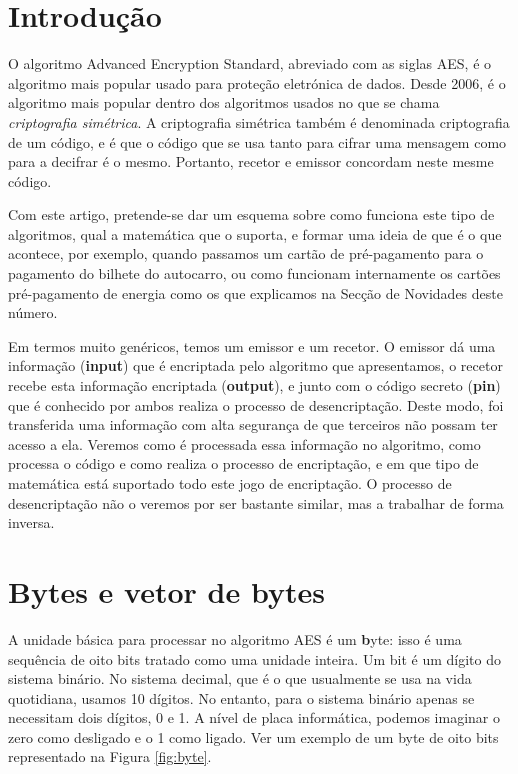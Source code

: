 \section*{Introdução}
O algoritmo Advanced Encryption Standard, abreviado com as siglas AES, é o algoritmo mais popular usado para proteção eletrónica de dados. Desde 2006, é o algoritmo mais popular dentro dos algoritmos usados no que se chama \emph{criptografia simétrica}. A criptografia simétrica também é denominada criptografia de um código, e é que o código que se usa tanto para cifrar uma mensagem como para a decifrar é o mesmo. Portanto, recetor e emissor concordam neste mesme código.

Com este artigo, pretende-se dar um esquema sobre como funciona este tipo de algoritmos, qual a matemática que o suporta, e formar uma ideia de que é o que acontece, por exemplo, quando passamos um cartão de pré-pagamento para o pagamento do bilhete do autocarro, ou como funcionam internamente os cartões pré-pagamento de energia como os que explicamos na Secção de Novidades deste número.

Em termos muito genéricos, temos um emissor e um recetor. O emissor dá uma informação (\textbf{input}) que é encriptada pelo algoritmo que apresentamos, o recetor recebe esta informação encriptada (\textbf{output}), e junto com o código secreto (\textbf{pin}) que é conhecido por ambos realiza o processo de desencriptação. Deste modo, foi transferida uma informação com alta segurança de que terceiros não possam ter acesso a ela. Veremos como é processada essa informação no algoritmo, como processa o código e como realiza o processo de encriptação, e em que tipo de matemática está suportado todo este jogo de encriptação. O processo de desencriptação não o veremos por ser bastante similar, mas a trabalhar de forma inversa.

\section{Bytes e vetor de bytes}
A unidade básica para processar no algoritmo AES é um {\textbf byte}: isso é uma sequência de oito bits tratado como uma unidade inteira. Um bit é um dígito do sistema binário. No sistema decimal, que é o que usualmente se usa na vida quotidiana, usamos 10 dígitos. No entanto, para o sistema binário apenas se necessitam dois dígitos, 0 e 1. A nível de placa informática, podemos imaginar o zero como desligado e o 1 como ligado. Ver um exemplo de um byte de oito bits representado na Figura \ref{fig:byte}.

